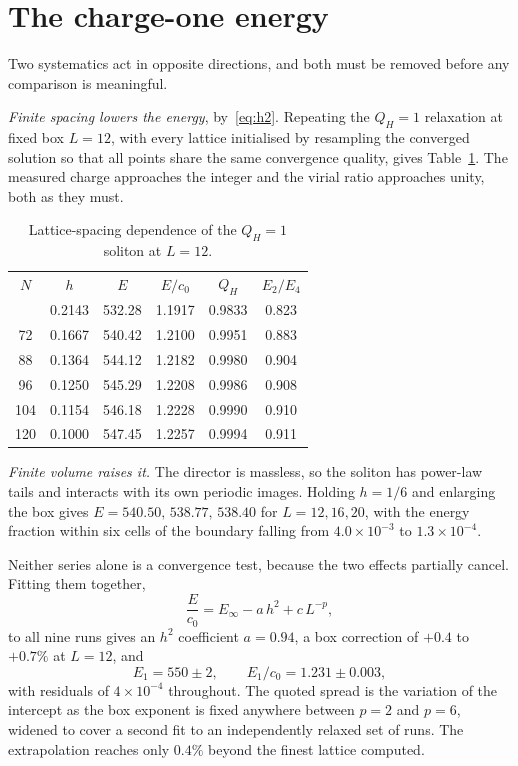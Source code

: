 \documentclass[aps,prd,preprint,nofootinbib,longbibliography]{revtex4-2}
\newcommand{\Qh}{Q_H}
\begin{document}
\section{The charge-one energy}
\label{sec:charge1}

Two systematics act in opposite directions, and both must be removed before any
comparison is meaningful.

\emph{Finite spacing lowers the energy}, by~\eqref{eq:h2}. Repeating the $\Qh=1$
relaxation at fixed box $L=12$, with every lattice initialised by resampling the
converged solution so that all points share the same convergence quality, gives
Table~\ref{tab:hconv}. The measured charge approaches the integer and the virial
ratio approaches unity, both as they must.

\begin{table}[t]
\caption{Lattice-spacing dependence of the $\Qh=1$ soliton at $L=12$.}
\label{tab:hconv}
\begin{ruledtabular}
\begin{tabular}{cccccc}
$N$ & $h$ & $E$ & $E/c_0$ & $\Qh$ & $E_2/E_4$ \\
\colrule
 56 & 0.2143 & 532.28 & 1.1917 & 0.9833 & 0.823 \\
 72 & 0.1667 & 540.42 & 1.2100 & 0.9951 & 0.883 \\
 88 & 0.1364 & 544.12 & 1.2182 & 0.9980 & 0.904 \\
 96 & 0.1250 & 545.29 & 1.2208 & 0.9986 & 0.908 \\
104 & 0.1154 & 546.18 & 1.2228 & 0.9990 & 0.910 \\
120 & 0.1000 & 547.45 & 1.2257 & 0.9994 & 0.911 \\
\end{tabular}
\end{ruledtabular}
\end{table}

\emph{Finite volume raises it.} The director is massless, so the soliton has
power-law tails and interacts with its own periodic images. Holding $h=1/6$ and
enlarging the box gives $E=540.50,\,538.77,\,538.40$ for $L=12,16,20$, with the
energy fraction within six cells of the boundary falling from
$4.0\times10^{-3}$ to $1.3\times10^{-4}$.

Neither series alone is a convergence test, because the two effects partially
cancel. Fitting them together,
\begin{equation}
\frac{E}{c_0} = E_\infty - a\,h^2 + c\,L^{-p},
\label{eq:extrap}
\end{equation}
to all nine runs gives an $h^2$ coefficient $a=0.94$, a box correction of $+0.4$
to $+0.7\%$ at $L=12$, and
\begin{equation}
E_1 = 550\pm2, \qquad E_1/c_0 = 1.231\pm0.003 ,
\label{eq:e1}
\end{equation}
with residuals of $4\times10^{-4}$ throughout. The quoted spread is the variation
of the intercept as the box exponent is fixed anywhere between $p=2$ and $p=6$,
widened to cover a second fit to an independently relaxed set of runs. The
extrapolation reaches only $0.4\%$ beyond the finest lattice computed.
\end{document}
